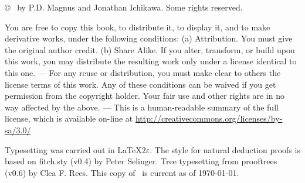 \vfill
{
\copyright\  by P.D. Magnus and Jonathan Ichikawa. Some rights reserved.
}

{\footnotesize
You are free to copy this book, to distribute it, to display it, and to make derivative works, under the following conditions: (a) Attribution. You must give the original author credit. (b) Share Alike. If you alter, transform, or build upon this work, you may distribute the resulting work only under a license identical to this one. --- For any reuse or distribution, you must make clear to others the license terms of this work. Any of these conditions can be waived if you get permission from the copyright holder. Your fair use and other rights are in no way affected by the above. --- This is a human-readable summary of the full license, which is available on-line at \url{http://creativecommons.org/licenses/by-sa/3.0/}

Typesetting was carried out  in \LaTeX$2\varepsilon$. The style for natural deduction proofs is based on fitch.sty (v0.4) by Peter Selinger. Tree typesetting from prooftrees (v0.6) by Clea F. Rees. This copy of \forallx\ is current as of \today.
}